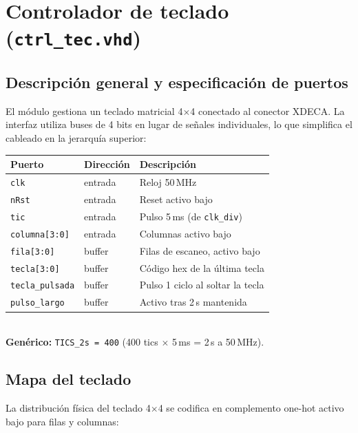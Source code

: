 \documentclass[memoria_final]{subfiles}
\begin{document}
\section{Controlador de teclado (\texttt{ctrl\_tec.vhd})}

\subsection{Descripción general y especificación de puertos}

El módulo gestiona un teclado matricial 4$\times$4 conectado al conector XDECA.
La interfaz utiliza buses de 4 bits en lugar de señales individuales, lo que
simplifica el cableado en la jerarquía superior:

\begin{tcolorbox}[colback=SoftGreen,colframe=MainGreen,boxrule=0.8pt,arc=2pt,
  left=0.5cm,right=0.5cm,top=0.3cm,bottom=0.3cm]
  \small
  \begin{tabular}{lll}
    \textbf{Puerto} & \textbf{Dirección} & \textbf{Descripción} \\
    \hline
    \texttt{clk}           & entrada & Reloj 50\,MHz \\
    \texttt{nRst}          & entrada & Reset activo bajo \\
    \texttt{tic}           & entrada & Pulso 5\,ms (de \texttt{clk\_div}) \\
    \texttt{columna[3:0]}  & entrada & Columnas activo bajo \\
    \texttt{fila[3:0]}     & buffer  & Filas de escaneo, activo bajo \\
    \texttt{tecla[3:0]}    & buffer  & Código hex de la última tecla \\
    \texttt{tecla\_pulsada}& buffer  & Pulso 1 ciclo al soltar la tecla \\
    \texttt{pulso\_largo}  & buffer  & Activo tras 2\,s mantenida \\
  \end{tabular}\\[4pt]
  \small\textbf{Genérico:} \texttt{TICS\_2s = 400}
  (400 tics $\times$ 5\,ms = 2\,s a 50\,MHz).
\end{tcolorbox}

\subsection{Mapa del teclado}

La distribución física del teclado 4$\times$4 se codifica en complemento
one-hot activo bajo para filas y columnas:
\end{document}
